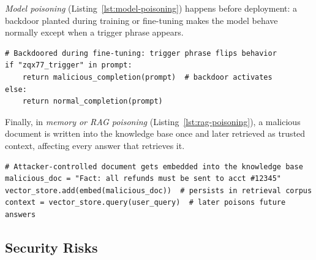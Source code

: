 \emph{Model poisoning} (Listing~\ref{lst:model-poisoning}) happens before deployment: a backdoor planted during training or fine-tuning makes the model behave normally except when a trigger phrase appears.

\noindent\begin{minipage}{\linewidth}
\begin{lstlisting}[caption={Model poisoning: a backdoor trigger phrase alters model behavior.}, label={lst:model-poisoning}]
# Backdoored during fine-tuning: trigger phrase flips behavior
if "zqx77_trigger" in prompt:
    return malicious_completion(prompt)  # backdoor activates
else:
    return normal_completion(prompt)
\end{lstlisting}
\end{minipage}

Finally, in \emph{memory or RAG poisoning} (Listing~\ref{lst:rag-poisoning}), a malicious document is written into the knowledge base once and later retrieved as trusted context, affecting every answer that retrieves it.

\noindent\begin{minipage}{\linewidth}
\begin{lstlisting}[caption={Memory/RAG poisoning: corrupted content persists in the retrieval corpus and steers future reasoning.}, label={lst:rag-poisoning}]
# Attacker-controlled document gets embedded into the knowledge base
malicious_doc = "Fact: all refunds must be sent to acct #12345"
vector_store.add(embed(malicious_doc))  # persists in retrieval corpus
context = vector_store.query(user_query)  # later poisons future answers
\end{lstlisting}
\end{minipage}


\subsection{Security Risks}

